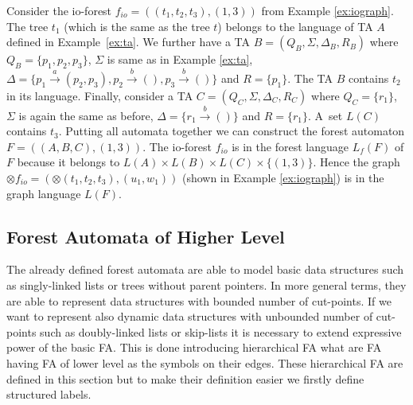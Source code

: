 \documentclass[a4paper, 12pt]{article}
\begin{document}
\bexmp
Consider the io-forest $f_{io}=((t_1,t_2,t_3), (1,3))$ from Example \ref{ex:iograph}.
The tree $t_1$ (which is the same as the tree $t$) belongs to the language of TA $A$
defined in Example~\ref{ex:ta}.
We further have a TA $B=(Q_B,\Sigma, \Delta_B, R_B)$ where $Q_B=\{p_1,p_2,p_3\}$,
$\Sigma$ is same as in Example \ref{ex:ta},
$\Delta=\{p_1 \xrightarrow{a} (p_2,p_3),
p_2 \xrightarrow{b} (),
p_3 \xrightarrow{b} ()\}$
and $R=\{p_1\}$.
The TA $B$ contains $t_2$ in its language.
Finally, consider a TA $C=(Q_C,\Sigma, \Delta_C, R_C)$ where $Q_C=\{r_1\}$,
$\Sigma$ is again the same as before,
$\Delta= \{r_1 \xrightarrow{b} ()\}$
and $R=\{r_1\}$.
A~set $L(C)$ contains $t_3$.
Putting all automata together we can construct the forest automaton $F=((A,B,C),(1,3))$.
The io-forest $f_{io}$ is in the forest language $L_f(F)$ of $F$ because it belongs
to $L(A) \times L(B) \times L(C) \times \{(1,3)\}$.
Hence the graph $\otimes f_{io} = (\otimes (t_1,t_2,t_3),(u_1,w_1))$
(shown in Example \ref{ex:iograph}) is in the graph language $L(F)$.
\eexmp

\subsection{Forest Automata of Higher Level}
\label{sec:fah}

The already defined forest automata are able to model basic data structures
such as singly-linked lists or trees without parent pointers.
In more general terms, they are able to represent data structures
with bounded number of cut-points.
If we want to represent also dynamic data structures with unbounded
number of cut-points such as doubly-linked lists or skip-lists it
is necessary to extend expressive power of the basic FA.
This is done introducing hierarchical FA what are FA having FA of lower level
as the symbols on their edges.
These hierarchical FA are defined in this section but to make their
definition easier we firstly define structured labels.
\end{document}

